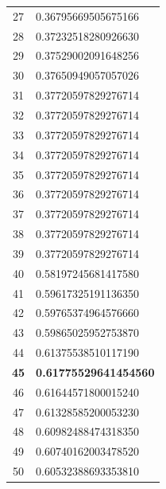 \begin{table}[H]
\begin{minipage}{.5\linewidth}
\begin{tabular}{@{}cl@{}}
          27 & 0.36795669505675166 \\ 
          28 & 0.37232518280926630 \\
          29 & 0.37529002091648256 \\
          30 & 0.37650949057057026 \\
          31 & 0.37720597829276714 \\
          32 & 0.37720597829276714 \\
          33 & 0.37720597829276714 \\
          34 & 0.37720597829276714 \\
          35 & 0.37720597829276714 \\
          36 & 0.37720597829276714 \\
          37 & 0.37720597829276714 \\
          38 & 0.37720597829276714 \\
          39 & 0.37720597829276714 \\
          40 & 0.58197245681417580 \\
          41 & 0.59617325191136350 \\
          42 & 0.59765374964576660 \\
          43 & 0.59865025952753870 \\
          44 & 0.61375538510117190 \\
          \textbf{45} & \textbf{0.61775529641454560} \\
          46 & 0.61644571800015240 \\
          47 & 0.61328585200053230 \\
          48 & 0.60982488474318350 \\
          49 & 0.60740162003478520 \\
          50 & 0.60532388693353810 \\ \bottomrule
      \end{tabular}
    \end{minipage}
\end{table}